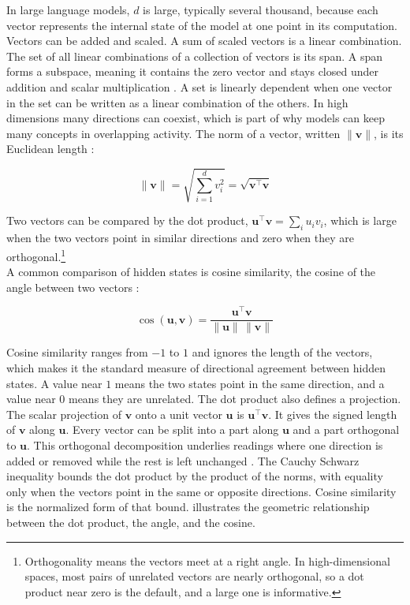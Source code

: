 In large language models, $d$ is large, typically several thousand, because each vector represents the internal state of the model at one point in its computation.
Vectors can be added and scaled.
A sum of scaled vectors is a linear combination.
The set of all linear combinations of a collection of vectors is its span.
A span forms a subspace, meaning it contains the zero vector and stays closed under addition and scalar multiplication \cite{lay2006linear}.
A set is linearly dependent when one vector in the set can be written as a linear combination of the others.
In high dimensions many directions can coexist, which is part of why models can keep many concepts in overlapping activity.
The norm of a vector, written $\lVert \mathbf{v} \rVert$, is its Euclidean length \cite[p.~331]{lay2006linear}:

\begin{equation}
\lVert \mathbf{v} \rVert = \sqrt{\sum_{i=1}^{d} v_i^2} = \sqrt{\mathbf{v}^\top \mathbf{v}}
\label{eq:norm}
\end{equation}

Two vectors can be compared by the dot product, $\mathbf{u}^\top \mathbf{v} = \sum_i u_i v_i$, which is large when the two vectors point in similar directions and zero when they are orthogonal.\footnote{Orthogonality means the vectors meet at a right angle. In high-dimensional spaces, most pairs of unrelated vectors are nearly orthogonal, so a dot product near zero is the default, and a large one is informative.}
\\

A common comparison of hidden states is cosine similarity, the cosine of the angle between two vectors \cite[p.~335]{lay2006linear}:

\begin{equation}
\cos(\mathbf{u}, \mathbf{v}) = \frac{\mathbf{u}^\top \mathbf{v}}{\lVert \mathbf{u} \rVert \, \lVert \mathbf{v} \rVert}
\label{eq:cosine}
\end{equation}

Cosine similarity ranges from $-1$ to $1$ and ignores the length of the vectors, which makes it the standard measure of directional agreement between hidden states.
A value near $1$ means the two states point in the same direction, and a value near $0$ means they are unrelated.
The dot product also defines a projection.
The scalar projection of $\mathbf{v}$ onto a unit vector $\mathbf{u}$ is $\mathbf{u}^\top \mathbf{v}$.
It gives the signed length of $\mathbf{v}$ along $\mathbf{u}$.
Every vector can be split into a part along $\mathbf{u}$ and a part orthogonal to $\mathbf{u}$.
This orthogonal decomposition underlies readings where one direction is added or removed while the rest is left unchanged \cite{lay2006linear}.
The Cauchy Schwarz inequality bounds the dot product by the product of the norms, with equality only when the vectors point in the same or opposite directions.
Cosine similarity is the normalized form of that bound.
 illustrates the geometric relationship between the dot product, the angle, and the cosine.

